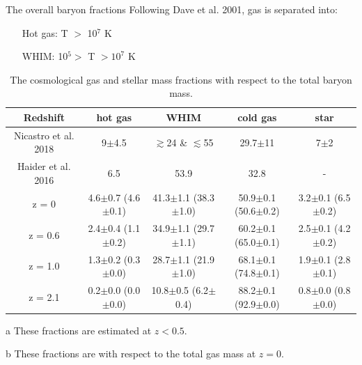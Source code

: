 \documentclass[aspectratio=169]{beamer}
\begin{document}
\begin{frame}{The overall baryon fractions}
Following Dave et al. 2001, gas is separated into:
\begin{itemize}
    \item[] Hot gas: T $>$ 10$^7$ K 
    \item[] WHIM: 10$^5 >$ T $> 10^7$ K 
\end{itemize}

\begin{table}
\fontsize{8}{8}\selectfont
    \centering
    \caption{The cosmological gas and stellar mass fractions with respect to the total baryon mass.}
    \begin{threeparttable}
        \begin{tabular}{|c|c|c|c|c|}
        \hline
            Redshift & hot gas & \alert{WHIM} & cold gas & star \\
            \hline
            Nicastro et al. 2018\tnote{a} & 9$\pm$4.5 & $\gtrsim$24 \& $\lesssim$55 & 29.7$\pm$11 & 7$\pm$2\\
            Haider et al. 2016\tnote{b} & 6.5 & 53.9 & 32.8 & - \\
            z = 0   & 4.6$\pm$0.7 (4.6$\pm$0.1) & \alert{41.3}$\pm$1.1 (38.3$\pm$1.0) & 50.9$\pm$0.1 (50.6$\pm$0.2) & 3.2$\pm$0.1 (6.5$\pm$0.2)\\
            z = 0.6 & 2.4$\pm$0.4 (1.1$\pm$0.2) & \alert{34.9}$\pm$1.1 (29.7$\pm$1.1) & 60.2$\pm$0.1 (65.0$\pm$0.1) & 2.5$\pm$0.1 (4.2$\pm$0.2)\\
            z = 1.0 & 1.3$\pm$0.2 (0.3$\pm$0.0) & \alert{28.7}$\pm$1.1 (21.9$\pm$1.0) & 68.1$\pm$0.1 (74.8$\pm$0.1) & 1.9$\pm$0.1 (2.8$\pm$0.1)\\
            z = 2.1 & 0.2$\pm$0.0 (0.0$\pm$0.0) & \alert{10.8}$\pm$0.5 (6.2$\pm$0.4) & 88.2$\pm$0.1 (92.9$\pm$0.0) & 0.8$\pm$0.0 (0.8$\pm$0.0)\\
            \hline
        \end{tabular}
        \begin{tablenotes}
        \item[a] These fractions are estimated at $z<0.5$.
        \item[b] These fractions are with respect to the total gas mass at $z=0$.
        \end{tablenotes}
    \end{threeparttable}
\end{table}
\end{frame}
\end{document}
